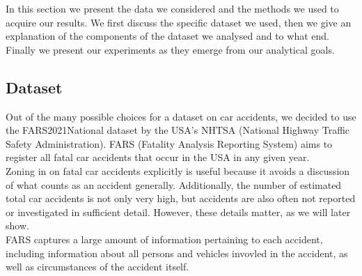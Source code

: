 \documentclass{article}
\theoremstyle{plain}
\theoremstyle{definition}
\theoremstyle{remark}
\begin{document}
In this section we present the data we considered and the methods we used to acquire our results. We first discuss the specific dataset we used, then we give an explanation of the components of the dataset we analysed and to what end. Finally we present our experiments as they emerge from our analytical goals.






\subsection{Dataset}
Out of the many possible choices for a dataset on car accidents, we decided to use the FARS2021National dataset by the USA's NHTSA (National Highway Traffic Safety Administration). FARS (Fatality Analysis Reporting System) aims to register all fatal car accidents that occur in the USA in any given year.\\
Zoning in on fatal car accidents explicitly is useful because it avoids a discussion of what counts as an accident generally. Additionally, the number of estimated total car accidents is not only very high, but accidents are also often not reported or investigated in sufficient detail. However, these details matter, as we will later show.\\
FARS captures a large amount of information pertaining to each accident, including information about all persons and vehicles invovled in the accident, as well as circumstances of the accident itself.
\end{document}
